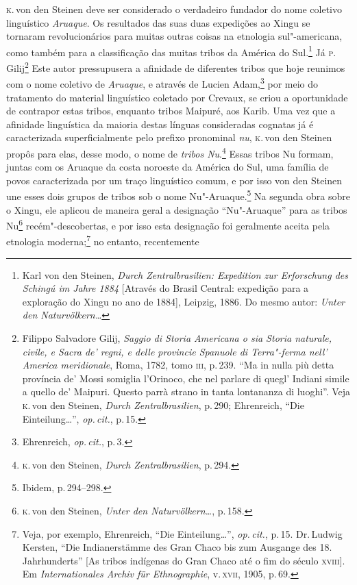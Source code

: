 \textsc{k}.\,von den Steinen deve ser considerado o verdadeiro fundador do nome
coletivo linguístico \textit{Aruaque}. Os resultados das suas duas expedições ao
Xingu se tornaram revolucionários para muitas outras coisas na etnologia
sul"-americana, como também para a classificação das muitas tribos da
América do Sul.\footnote{Karl von den Steinen, \textit{Durch
  Zentralbrasilien: Expedition zur Erforschung des Schingú im Jahre
  1884} {[}Através do Brasil Central: expedição para a exploração do
  Xingu no ano de 1884{]}, Leipzig, 1886. Do mesmo autor: \textit{Unter den Naturvölkern\ldots}} Já \textsc{p}.\,Gilij\footnote{Filippo Salvadore Gilij,
  \textit{Saggio di Storia Americana o sia Storia
  naturale, civile, e Sacra de' regni, e delle provincie Spanuole di
  Terra"-ferma nell' America meridionale}, Roma, 1782, tomo \textsc{iii}, p.\,239.
  ``Ma in nulla più detta província de' Mossi somiglia l'Orinoco, che
  nel parlare di quegl' Indiani simile a quello de' Maipuri. Questo
  parrà strano in tanta lontananza di luoghi''.
  Veja \textsc{k}.\,von den Steinen, \textit{Durch Zentralbrasilien}, p.\,290;
  Ehrenreich, ``Die Einteilung\ldots'', \textit{op.\,cit.}, p.\,15.} Este autor pressupusera a afinidade de diferentes tribos que hoje
reunimos com o nome coletivo de \textit{Aruaque}, e através de Lucien
Adam,\footnote{Ehrenreich, \textit{op.\,cit.}, p.\,3.} por meio do tratamento do
material linguístico coletado por Crevaux, se criou a oportunidade de
contrapor estas tribos, enquanto tribos Maipuré, aos Karib. Uma vez que
a afinidade linguística da maioria destas línguas consideradas cognatas
já é caracterizada superficialmente pelo prefixo pronominal \textit{nu}, \textsc{k.}\,von 
den Steinen propôs para elas, desse modo, o nome de \textit{tribos
Nu}.\footnote{\textsc{k}.\,von den Steinen, \textit{Durch Zentralbrasilien}, p.\,294.}
Essas tribos Nu formam, juntas com os Aruaque da costa noroeste da
América do Sul, uma família de povos caracterizada por um traço
linguístico comum, e por isso von den Steinen une esses dois grupos
de tribos sob o nome Nu"-Aruaque.\footnote{Ibidem, p.\,294--298.} Na
segunda obra sobre o Xingu, ele aplicou de maneira geral a
designação ``Nu"-Aruaque'' para as tribos Nu\footnote{\textsc{k}.\,von den
  Steinen, \textit{Unter den Naturvölkern\ldots}, p.\,158.}
recém"-descobertas, e por isso esta designação foi geralmente
aceita pela etnologia moderna;\footnote{Veja, por exemplo, Ehrenreich,
  ``Die Einteilung\ldots'', \textit{op.\,cit.}, p.\,15. Dr.\,Ludwig Kersten, ``Die Indianerstämme des Gran Chaco
  bis zum Ausgange des 18. Jahrhunderts'' {[}As tribos indígenas do Gran
  Chaco até o fim do século \textsc{xviii}{]}. Em \textit{Internationales Archiv
  für Ethnographie}, v.\,\textsc{xvii}, 1905, p.\,69.} no entanto, recentemente
